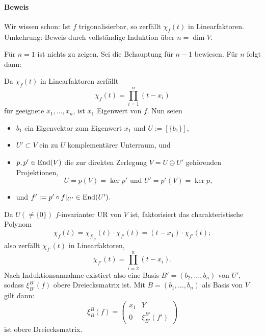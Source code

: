 \paragraph{Beweis}
	Wir wissen schon: Ist $ f $ trigonalisierbar, so zerfällt $ \chi_f(t) $ in Linearfaktoren. Umkehrung: Beweis durch vollständige Induktion über $ n=\dim V $.
	
	Für $ n=1 $ ist nichts zu zeigen. Sei die Behauptung für $ n-1 $ bewiesen. Für $ n $ folgt dann:
	
	Da $ \chi_f(t) $ in Linearfaktoren zerfällt
		\[ \chi_f(t)=\prod_{i=1}^{n}(t-x_i) \]
	für geeignete $ x_1,\dots,x_n $, ist $ x_1 $ Eigenwert von $ f $. Nun seien
	\begin{itemize}
		\item $ b_1 $ ein Eigenvektor zum Eigenwert $ x_1 $ und $ U:= [\{b_1\}] $,
		\item $ U'\subset V $ ein zu $ U $ komplementärer Unterraum, und
		\item $ p,p'\in \operatorname{End}(V) $ die zur direkten Zerlegung $ V = U\oplus U' $ gehörenden Projektionen,
			\[ U = p(V) = \ker p' \text{ und } U' = p'(V) = \ker p, \]
		\item und $ f' := p'\circ f|_{U'}\in\operatorname{End}(U'). $
	\end{itemize}
	Da $ U (\neq \{0\}) $ $ f $-invarianter UR von $ V $ ist, faktorisiert das charakteristische Polynom
		\[ \chi_f(t)=\chi_{f|_U}(t)\cdot \chi_{f'}(t) = (t-x_1)\cdot \chi_{f'}(t); \]
	also zerfällt $ \chi_{f'}(t) $ in Linearfaktoren,
		\[ \chi_{f'}(t)=\prod_{i=2}^{n}(t-x_i). \]
	Nach Induktionsannahme existiert also eine Basis $ B' = (b_2,\dots,b_n) $ von $ U' $, sodass $ \xi_{B'}^{B'}(f) $ obere Dreiecksmatrix ist. Mit $ B=(b_1,\dots,b_n) $ als Basis von $ V $ gilt dann:
		\[ \xi_B^B (f) =
			\begin{pmatrix}
			x_1& Y\\
			0 & \xi_{B'}^{B'}(f')
			\end{pmatrix} \]
	ist obere Dreiecksmatrix.